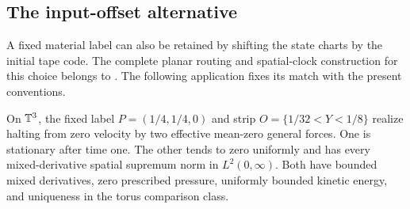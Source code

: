 \subsection{The input-offset alternative}\label{bc:input-offset-section}
A fixed material label can also be retained by shifting the state charts
by the initial tape code. The complete planar routing and spatial-clock
construction for this choice belongs to
\cite[Theorem~4.1 and Section~5]{OpenAI379StationaryA2}.
The following application fixes its match with the present conventions.

\begin{corollary}
\label{bc:input-offset-event}
On $\mathbb T^3$, the fixed label $P=(1/4,1/4,0)$ and strip
$O=\{1/32<Y<1/8\}$ realize halting from zero velocity by two effective
mean-zero general forces. One is stationary after time one. The other
tends to zero uniformly and has every mixed-derivative spatial supremum
norm in $L^2(0,\infty)$. Both have bounded mixed derivatives, zero
prescribed pressure, uniformly bounded kinetic energy, and uniqueness in
the torus comparison class.
\end{corollary}
